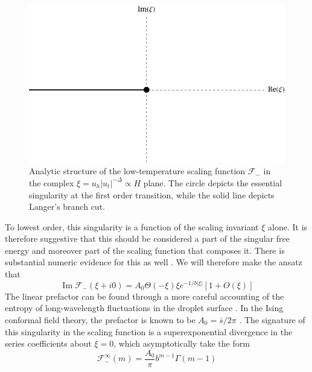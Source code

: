 \documentclass[
aps,
pre,
preprint,
longbibliography,
floatfix
]{revtex4-2}
\begin{document}
\begin{figure}
  \includegraphics{figs/F_lower_singularities.pdf}
  \caption{
    Analytic structure of the low-temperature scaling function $\mathcal F_-$
    in the complex $\xi=u_h|u_t|^{-\Delta}\propto H$ plane. The circle
    depicts the essential singularity at the first order transition, while the
    solid line depicts Langer's branch cut.
  } \label{fig:lower.singularities}
\end{figure}

To lowest order, this singularity is a function of the scaling invariant $\xi$
alone. It is therefore suggestive that this should be considered a part of the
singular free energy and moreover part of the scaling function that composes
it. There is substantial numeric evidence for this as well
\cite{Enting_1980_An, Fonseca_2003_Ising}. We will therefore make the ansatz
that
\begin{equation} \label{eq:essential.singularity}
  \operatorname{Im}\mathcal F_-(\xi+i0)=A_0\Theta(-\xi)\xi e^{-1/b|\xi|}\left[1+O(\xi)\right]
\end{equation}
The linear prefactor can be found through a more careful accounting of the
entropy of long-wavelength fluctuations in the droplet surface
\cite{Gunther_1980_Goldstone, Houghton_1980_The}. In the Ising conformal field
theory, the prefactor is known to be $A_0=\bar s/2\pi$
\cite{Voloshin_1985_Decay, Fonseca_2003_Ising}. The signature of this
singularity in the scaling function is a superexponential divergence in the
series coefficients about $\xi=0$, which asymptotically take the form
\begin{equation} \label{eq:low.asymptotic}
  \mathcal F_-^\infty(m)=\frac{A_0}\pi b^{m-1}\Gamma(m-1)
\end{equation}
\end{document}
